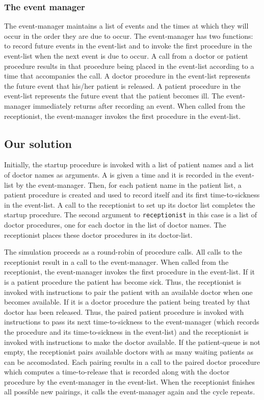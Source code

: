 \subsubsection{The event manager}

The event-manager maintains a list of events and the times at which they will
occur in the order they are due to occur.  The event-manager has two functions:
to record future events in the event-list and to invoke the first procedure
in the event-list when the next event is due to occur.  A call from a doctor
or patient procedure results in that procedure being placed in the event-list
according to a time that accompanies the call.  A doctor procedure in the
event-list represents the future event that his/her patient is released.
A patient procedure in the event-list represents the future event that the
patient becomes ill.  The event-manager immediately returns after recording
an event.  When called from the receptionist, the event-manager invokes the
first procedure in the event-list.

\subsection{Our solution}

Initially, the startup procedure  is invoked
with a list of patient names and a list of doctor names as arguments.  A
 is given a time and it is recorded in the event-list by the
event-manager.  Then, for each patient name in the patient list, a patient
procedure is created and used to record itself and its first time-to-sickness
in the event-list.  A call to the receptionist to set up its doctor list
completes the startup procedure.  The second argument to {\tt receptionist} in
this case is a list of doctor procedures, one for each doctor in the list of
doctor names.  The receptionist places these doctor procedures in its
doctor-list.

The simulation proceeds as a round-robin of procedure calls.  All calls
to the receptionist result in a call to the event-manager.  When called from
the receptionist, the event-manager invokes the first procedure in the
event-list.  If it is a patient procedure the patient has become sick.  Thus,
the receptionist is invoked with instructions to pair the patient with an
available doctor when one becomes available.  If it is a doctor procedure the
patient being treated by that doctor has been released.  Thus, the paired
patient procedure is invoked with instructions to pass its next
time-to-sickness to the event-manager (which records the procedure and its
time-to-sickness in the event-list) and the receptionist is invoked with
instructions to make the doctor available.  If the patient-queue is
not empty, the receptionist pairs available doctors with as many waiting
patients as can be accomodated.  Each pairing results in a call to the paired
doctor procedure which computes a time-to-release that is recorded along
with the doctor procedure by the event-manager in the event-list.  When the
receptionist finishes all possible new pairings, it calls the event-manager
again and the cycle repeats.


